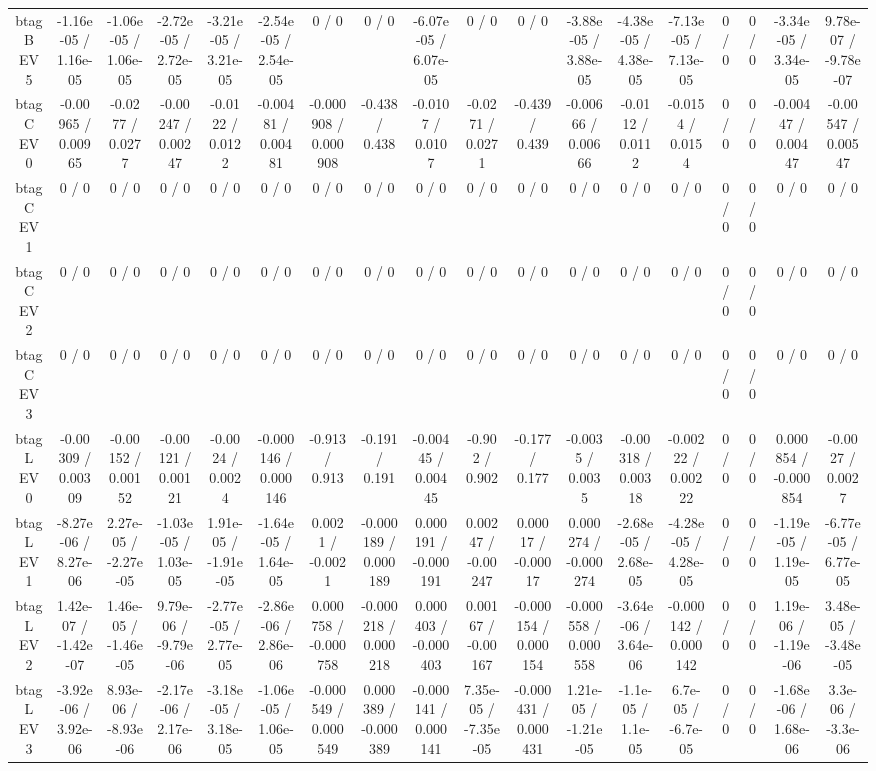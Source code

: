 \documentclass[10pt]{article}
\begin{document}
\begin{table}[htbp]
\begin{center}
\begin{tabular}{|c|c|c|c|c|c|c|c|c|c|c|c|c|c|c|c|c|c|}
  btag B EV 5 & -1.16e-05 / 1.16e-05 & -1.06e-05 / 1.06e-05 & -2.72e-05 / 2.72e-05 & -3.21e-05 / 3.21e-05 & -2.54e-05 / 2.54e-05 & 0 / 0 & 0 / 0 & -6.07e-05 / 6.07e-05 & 0 / 0 & 0 / 0 & -3.88e-05 / 3.88e-05 & -4.38e-05 / 4.38e-05 & -7.13e-05 / 7.13e-05 & 0 / 0 & 0 / 0 & -3.34e-05 / 3.34e-05 & 9.78e-07 / -9.78e-07 \\ 
  btag C EV 0 & -0.00965 / 0.00965 & -0.0277 / 0.0277 & -0.00247 / 0.00247 & -0.0122 / 0.0122 & -0.00481 / 0.00481 & -0.000908 / 0.000908 & -0.438 / 0.438 & -0.0107 / 0.0107 & -0.0271 / 0.0271 & -0.439 / 0.439 & -0.00666 / 0.00666 & -0.0112 / 0.0112 & -0.0154 / 0.0154 & 0 / 0 & 0 / 0 & -0.00447 / 0.00447 & -0.00547 / 0.00547 \\ 
  btag C EV 1 & 0 / 0 & 0 / 0 & 0 / 0 & 0 / 0 & 0 / 0 & 0 / 0 & 0 / 0 & 0 / 0 & 0 / 0 & 0 / 0 & 0 / 0 & 0 / 0 & 0 / 0 & 0 / 0 & 0 / 0 & 0 / 0 & 0 / 0 \\ 
  btag C EV 2 & 0 / 0 & 0 / 0 & 0 / 0 & 0 / 0 & 0 / 0 & 0 / 0 & 0 / 0 & 0 / 0 & 0 / 0 & 0 / 0 & 0 / 0 & 0 / 0 & 0 / 0 & 0 / 0 & 0 / 0 & 0 / 0 & 0 / 0 \\ 
  btag C EV 3 & 0 / 0 & 0 / 0 & 0 / 0 & 0 / 0 & 0 / 0 & 0 / 0 & 0 / 0 & 0 / 0 & 0 / 0 & 0 / 0 & 0 / 0 & 0 / 0 & 0 / 0 & 0 / 0 & 0 / 0 & 0 / 0 & 0 / 0 \\ 
  btag L EV 0 & -0.00309 / 0.00309 & -0.00152 / 0.00152 & -0.00121 / 0.00121 & -0.0024 / 0.0024 & -0.000146 / 0.000146 & -0.913 / 0.913 & -0.191 / 0.191 & -0.00445 / 0.00445 & -0.902 / 0.902 & -0.177 / 0.177 & -0.0035 / 0.0035 & -0.00318 / 0.00318 & -0.00222 / 0.00222 & 0 / 0 & 0 / 0 & 0.000854 / -0.000854 & -0.0027 / 0.0027 \\ 
  btag L EV 1 & -8.27e-06 / 8.27e-06 & 2.27e-05 / -2.27e-05 & -1.03e-05 / 1.03e-05 & 1.91e-05 / -1.91e-05 & -1.64e-05 / 1.64e-05 & 0.0021 / -0.0021 & -0.000189 / 0.000189 & 0.000191 / -0.000191 & 0.00247 / -0.00247 & 0.00017 / -0.00017 & 0.000274 / -0.000274 & -2.68e-05 / 2.68e-05 & -4.28e-05 / 4.28e-05 & 0 / 0 & 0 / 0 & -1.19e-05 / 1.19e-05 & -6.77e-05 / 6.77e-05 \\ 
  btag L EV 2 & 1.42e-07 / -1.42e-07 & 1.46e-05 / -1.46e-05 & 9.79e-06 / -9.79e-06 & -2.77e-05 / 2.77e-05 & -2.86e-06 / 2.86e-06 & 0.000758 / -0.000758 & -0.000218 / 0.000218 & 0.000403 / -0.000403 & 0.00167 / -0.00167 & -0.000154 / 0.000154 & -0.000558 / 0.000558 & -3.64e-06 / 3.64e-06 & -0.000142 / 0.000142 & 0 / 0 & 0 / 0 & 1.19e-06 / -1.19e-06 & 3.48e-05 / -3.48e-05 \\ 
  btag L EV 3 & -3.92e-06 / 3.92e-06 & 8.93e-06 / -8.93e-06 & -2.17e-06 / 2.17e-06 & -3.18e-05 / 3.18e-05 & -1.06e-05 / 1.06e-05 & -0.000549 / 0.000549 & 0.000389 / -0.000389 & -0.000141 / 0.000141 & 7.35e-05 / -7.35e-05 & -0.000431 / 0.000431 & 1.21e-05 / -1.21e-05 & -1.1e-05 / 1.1e-05 & 6.7e-05 / -6.7e-05 & 0 / 0 & 0 / 0 & -1.68e-06 / 1.68e-06 & 3.3e-06 / -3.3e-06 \\ 

\end{tabular}
\end{center}
\end{table}
\end{document}

